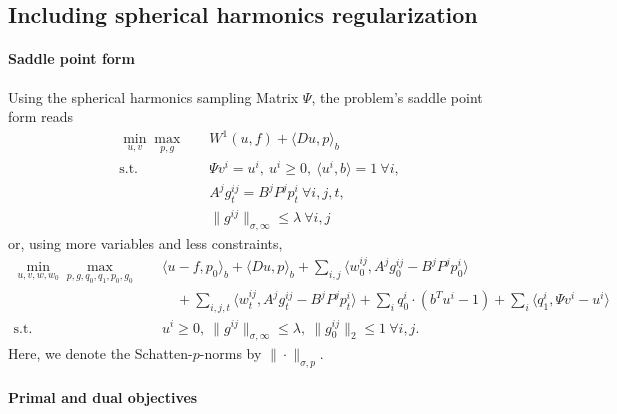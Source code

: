 
\subsection{Including spherical harmonics regularization}

\paragraph{Saddle point form}

Using the spherical harmonics sampling Matrix $\Psi$, the problem's saddle point
form reads
\begin{align*}
    \min_{u,v} \max_{p,g} \quad
        & W^1(u,f) + \langle Du, p \rangle_b \\
    \text{s.t.}\quad 
        & \Psi v^i = u^i,
            ~u^i \geq 0, ~\langle u^i, b \rangle = 1 ~\forall i, \\
        & A^j g^{ij}_t = B^j P^j p^i_t ~\forall i,j,t, \\
        & \|g^{ij}\|_{\sigma,\infty} \leq \lambda ~\forall i,j
\end{align*}
or, using more variables and less constraints,
\begin{align*}
    \min_{u,v,w,w_0} \max_{p,g,q_0,q_1,p_0,g_0} \quad
        & \langle u-f, p_0 \rangle_b
            + \langle Du, p \rangle_b
            + \sum_{i,j} \langle w_0^{ij}, A^j g_0^{ij} - B^j P^j p_0^i \rangle
            \\
        &\quad + \sum_{i,j,t} \langle w^{ij}_t, A^j g^{ij}_t - B^j P^j p^i_t \rangle
            + \sum_{i} q_0^i \cdot (b^T u^i - 1)
            + \sum_{i} \langle q_1^i, \Psi v^i - u^i \rangle \\
    \text{s.t.}\quad 
        & u^i \geq 0,
            ~\|g^{ij}\|_{\sigma,\infty} \leq \lambda,
            ~\|g_0^{ij}\|_{2} \leq 1 ~\forall i,j.
\end{align*}
Here, we denote the Schatten-$p$-norms by $\|\cdot\|_{\sigma,p}$.

\paragraph{Primal and dual objectives}

